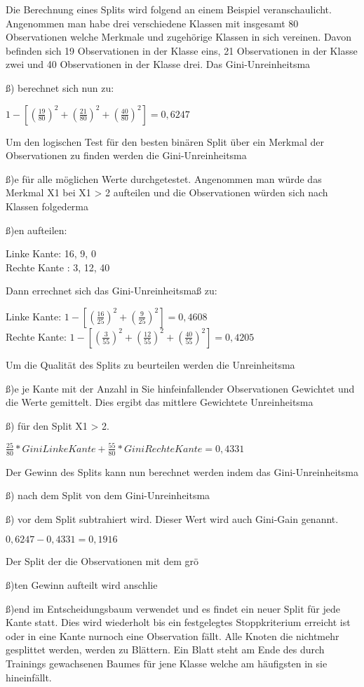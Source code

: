 Die Berechnung eines Splits wird folgend an einem Beispiel veranschaulicht.
Angenommen man habe drei verschiedene Klassen mit insgesamt 80 Observationen welche Merkmale und zugeh{\"o}rige Klassen in sich vereinen.
Davon befinden sich 19 Observationen in der Klasse eins, 21 Observationen in der Klasse zwei und 40 Observationen in der Klasse drei. Das Gini-Unreinheitsma{\ss) berechnet sich nun zu:


${ \displaystyle 1- [ (\frac{19}{80})^2 + (\frac{21}{80})^2 + (\frac{40}{80})^2] = 0,6247 }$


Um den logischen Test f{\"u}r den besten bin{\"a}ren Split {\"u}ber ein Merkmal der Observationen zu finden werden die Gini-Unreinheitsma{\ss)e f{\"u}r alle m{\"o}glichen Werte durchgetestet.
Angenommen man w{\"u}rde das Merkmal X1 bei X1 > 2 aufteilen und die Observationen w{\"u}rden sich nach Klassen folgederma{\ss)en aufteilen:

Linke Kante: 16, 9, 0\\
Rechte Kante : 3, 12, 40

Dann errechnet sich das Gini-Unreinheitsma{\ss} zu:

Linke Kante:   ${ \displaystyle 1 - [ (\frac{16}{25})^2 + (\frac{9}{25})^2] = 0,4608}$\\
Rechte Kante: ${ \displaystyle 1 - [ (\frac{3}{55})^2 + (\frac{12}{55})^2+ (\frac{40}{55})^2] = 0,4205}$

Um die Qualit{\"a}t des Splits zu beurteilen werden die Unreinheitsma{\ss)e je Kante mit der Anzahl in Sie hinfeinfallender Observationen Gewichtet und die Werte gemittelt. 
Dies ergibt das mittlere Gewichtete Unreinheitsma{\ss) f{\"u}r den Split X1 > 2.

${ \displaystyle \frac{25}{80} * Gini Linke Kante + \frac{55}{80} * Gini Rechte Kante = 0,4331}$

Der Gewinn des Splits kann nun berechnet werden indem das Gini-Unreinheitsma{\ss) nach dem Split von dem Gini-Unreinheitsma{\ss) vor dem Split subtrahiert wird. Dieser Wert wird auch Gini-Gain genannt. 

$ {\displaystyle 0,6247 - 0,4331 = 0,1916}$

Der Split der die Observationen mit dem gr{\"o}{\ss)ten Gewinn aufteilt wird anschlie{\ss)end im Entscheidungsbaum verwendet und es findet ein neuer Split f{\"u}r jede Kante statt.
Dies wird wiederholt bis ein festgelegtes Stoppkriterium erreicht ist oder in eine Kante nurnoch eine Observation f{\"a}llt. Alle Knoten die nichtmehr gesplittet werden, werden zu Bl{\"a}ttern.
Ein Blatt steht am Ende des durch Trainings gewachsenen Baumes f{\"u}r jene Klasse welche am h{\"a}ufigsten in sie hineinf{\"a}llt.

}}}}}}}}}
